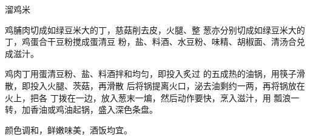 \begin{recipe}{溜鸡米}

\ingredients


\cooking

\step 鸡脯肉切成如绿豆米大的丁，慈菇削去皮，火腿、整 葱亦分别切成如绿豆米大的丁，鸡蛋合干豆粉搅成蛋清豆 粉，盐、料酒、水豆粉、味精、胡椒面、清汤合兑成滋汁。

\step 鸡肉丁用蛋清豆粉、盐、料酒拌和均匀，即投入炙过 的五成热的油锅，用筷子滑散，即投入火腿、茨菇，再滑散 后将锅提离火口，泌去油剩约一两，再将锅放在火上，把各 丁拨在一边，放入葱末一煸，然后动作要快，烹入滋汁，用 瓢浪一转，加香油或鸡油起锅，盛入深色条盘。

\notes

颜色调和，鲜嫩味美，酒饭均宜。

\end{recipe}

